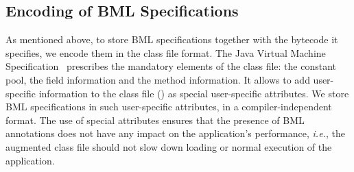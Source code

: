	
 
\subsection{Encoding of BML Specifications}

As mentioned above, to store BML specifications together with the
bytecode it specifies, we encode them in the class file format. The
Java Virtual Machine Specification~\cite{JVMspec} prescribes the
mandatory elements of the class file: the constant pool, the field
information and the method information. It allows to add user-specific
information to the class file (\cite[\S4.7.1]{JVMspec}) as special
user-specific attributes.  We store BML specifications in such
user-specific attributes, in a compiler-independent format. The use of
special attributes ensures that the presence of BML annotations does
not have any impact on the application's performance, \emph{i.e.}, the
augmented class file should not slow down loading or normal execution
of the application. 

